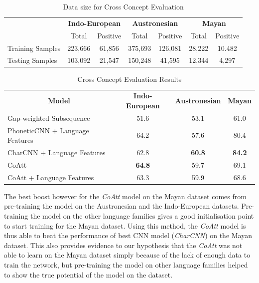 \documentclass[11pt,letterpaper]{article}
\begin{document}
\begin{table}[t]
\centering
\begin{tabular}{lcccccc}
\multicolumn{1}{c}{\textbf{}} & \multicolumn{2}{c}{\textbf{Indo-European}} & \multicolumn{2}{c}{\textbf{Austronesian}} & \multicolumn{2}{c}{\textbf{Mayan}} \\
\multicolumn{1}{c}{}          & Total               & Positive             & Total               & Positive            & Total           & Positive         \\
Training Samples              & 223,666             & 61,856               & 375,693             & 126,081             & 28,222          & 10.482           \\
Testing Samples               & 103,092             & 21,547               & 150,248             & 41,595              & 12,344          & 4,297           
\end{tabular}
\caption{Data size for Cross Concept Evaluation}
\label{CC_count}
\end{table}

\begin{table}[t]
\centering
\begin{tabular}{lccc}
\multicolumn{1}{c}{\textbf{Model}} & \textbf{Indo-European} & \textbf{Austronesian} & \textbf{Mayan} \\
Gap-weighted Subsequence           & 51.6                   & 53.1                  & 61.0           \\
PhoneticCNN + Language Features                 & 64.2                   & 57.6                  & 80.4           \\
CharCNN + Language Features                     & 62.8                   & \textbf{60.8}                  & \textbf{84.2}           \\ \hline
CoAtt                              & \textbf{64.8}                   & 59.7                  & 69.1           \\
CoAtt + Language Features                       & 63.3                   & 59.9                  & 68.6          
\end{tabular}
\label{CC_res}
\caption{Cross Concept Evaluation Results}
\end{table}

The best boost however for the \textit{CoAtt} model on the Mayan dataset comes from pre-training the model on the Austronesian and the Indo-European datasets. Pre-training the model on the other language families gives a good initialisation point to start training for the Mayan dataset. Using this method, the \textit{CoAtt} model is thus able to beat the performance of best CNN model (\textit{CharCNN}) on the Mayan dataset. This also provides evidence to our hypothesis that the \textit{CoAtt} was not able to learn on the Mayan dataset simply because of the lack of enough data to train the network, but pre-training the model on other language families helped to show the true potential of the model on the dataset.
\end{document}
